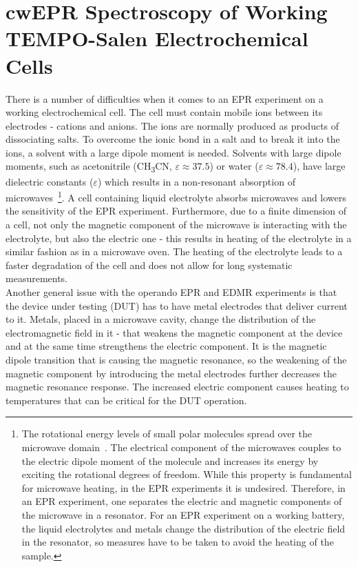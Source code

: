 \section{cwEPR Spectroscopy of Working\\TEMPO-Salen Electrochemical Cells}
There is a number of difficulties when it comes to an EPR experiment on a working electrochemical cell. The cell must contain mobile ions between its electrodes - cations and anions. The ions are normally produced as products of dissociating salts. To overcome the ionic bond in a salt and to break it into the ions, a solvent with a large dipole moment is needed. Solvents with large dipole moments, such as acetonitrile (CH\textsubscript{3}CN, $\varepsilon\approx 37.5$) or water ($\varepsilon\approx78.4$), have large dielectric constants ($\varepsilon$) which results in a non-resonant absorption of microwaves~\footnote{The rotational energy levels of small polar molecules spread over the microwave domain~\cite{Dermtroeder_3}. The electrical component of the microwaves couples to the electric dipole moment of the molecule and increases its energy by exciting the rotational degrees of freedom. While this property is fundamental for microwave heating, in the EPR experiments it is undesired. Therefore, in an EPR experiment, one separates the electric and magnetic components of the microwave in a resonator. For an EPR experiment on a working battery, the liquid electrolytes and metals change the distribution of the electric field in the resonator, so measures have to be taken to avoid the heating of the sample.}. A cell containing liquid electrolyte absorbs microwaves and lowers the sensitivity of the EPR experiment. Furthermore, due to a finite dimension of a cell, not only the magnetic component of the microwave is interacting with the electrolyte, but also the electric one - this results in heating of the electrolyte in a similar fashion as in a microwave oven. The heating of the electrolyte leads to a faster degradation of the cell and does not allow for long systematic measurements.\\
Another general issue with the operando EPR and EDMR experiments is that the device under testing (DUT) has to have metal electrodes that deliver current to it. Metals, placed in a microwave cavity, change the distribution of the electromagnetic field in it - that weakens the magnetic component at the device and at the same time strengthens the electric component. It is the magnetic dipole transition that is causing the magnetic resonance, so the weakening of the magnetic component by introducing the metal electrodes further decreases the magnetic resonance response. The increased electric component causes heating to temperatures that can be critical for the DUT operation.

